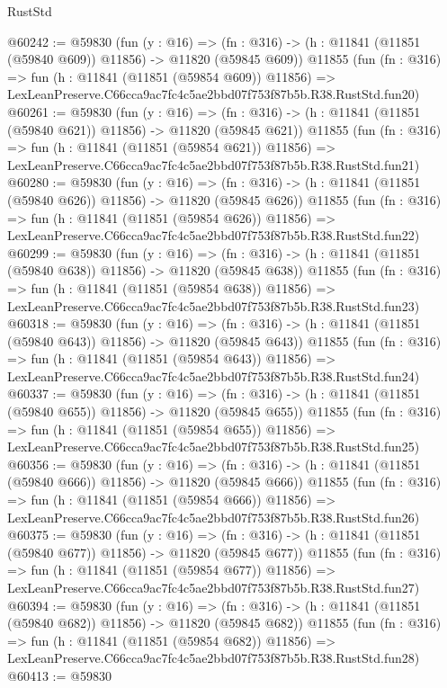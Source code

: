 \begin{lexlean}{RustStd}
\begin{coremodule}
@60242 := @59830
    (fun (y : @16) =>
    (fn : @316) -> (h : @11841 (@11851 (@59840 @609)) @11856) -> @11820 (@59845 @609))
    @11855
    (fun (fn : @316) =>
    fun (h : @11841 (@11851 (@59854 @609)) @11856) =>
    LexLeanPreserve.C66cca9ac7fc4c5ae2bbd07f753f87b5b.R38.RustStd.fun20)
@60261 := @59830
    (fun (y : @16) =>
    (fn : @316) -> (h : @11841 (@11851 (@59840 @621)) @11856) -> @11820 (@59845 @621))
    @11855
    (fun (fn : @316) =>
    fun (h : @11841 (@11851 (@59854 @621)) @11856) =>
    LexLeanPreserve.C66cca9ac7fc4c5ae2bbd07f753f87b5b.R38.RustStd.fun21)
@60280 := @59830
    (fun (y : @16) =>
    (fn : @316) -> (h : @11841 (@11851 (@59840 @626)) @11856) -> @11820 (@59845 @626))
    @11855
    (fun (fn : @316) =>
    fun (h : @11841 (@11851 (@59854 @626)) @11856) =>
    LexLeanPreserve.C66cca9ac7fc4c5ae2bbd07f753f87b5b.R38.RustStd.fun22)
@60299 := @59830
    (fun (y : @16) =>
    (fn : @316) -> (h : @11841 (@11851 (@59840 @638)) @11856) -> @11820 (@59845 @638))
    @11855
    (fun (fn : @316) =>
    fun (h : @11841 (@11851 (@59854 @638)) @11856) =>
    LexLeanPreserve.C66cca9ac7fc4c5ae2bbd07f753f87b5b.R38.RustStd.fun23)
@60318 := @59830
    (fun (y : @16) =>
    (fn : @316) -> (h : @11841 (@11851 (@59840 @643)) @11856) -> @11820 (@59845 @643))
    @11855
    (fun (fn : @316) =>
    fun (h : @11841 (@11851 (@59854 @643)) @11856) =>
    LexLeanPreserve.C66cca9ac7fc4c5ae2bbd07f753f87b5b.R38.RustStd.fun24)
@60337 := @59830
    (fun (y : @16) =>
    (fn : @316) -> (h : @11841 (@11851 (@59840 @655)) @11856) -> @11820 (@59845 @655))
    @11855
    (fun (fn : @316) =>
    fun (h : @11841 (@11851 (@59854 @655)) @11856) =>
    LexLeanPreserve.C66cca9ac7fc4c5ae2bbd07f753f87b5b.R38.RustStd.fun25)
@60356 := @59830
    (fun (y : @16) =>
    (fn : @316) -> (h : @11841 (@11851 (@59840 @666)) @11856) -> @11820 (@59845 @666))
    @11855
    (fun (fn : @316) =>
    fun (h : @11841 (@11851 (@59854 @666)) @11856) =>
    LexLeanPreserve.C66cca9ac7fc4c5ae2bbd07f753f87b5b.R38.RustStd.fun26)
@60375 := @59830
    (fun (y : @16) =>
    (fn : @316) -> (h : @11841 (@11851 (@59840 @677)) @11856) -> @11820 (@59845 @677))
    @11855
    (fun (fn : @316) =>
    fun (h : @11841 (@11851 (@59854 @677)) @11856) =>
    LexLeanPreserve.C66cca9ac7fc4c5ae2bbd07f753f87b5b.R38.RustStd.fun27)
@60394 := @59830
    (fun (y : @16) =>
    (fn : @316) -> (h : @11841 (@11851 (@59840 @682)) @11856) -> @11820 (@59845 @682))
    @11855
    (fun (fn : @316) =>
    fun (h : @11841 (@11851 (@59854 @682)) @11856) =>
    LexLeanPreserve.C66cca9ac7fc4c5ae2bbd07f753f87b5b.R38.RustStd.fun28)
@60413 := @59830

\end{coremodule}
\end{lexlean}
